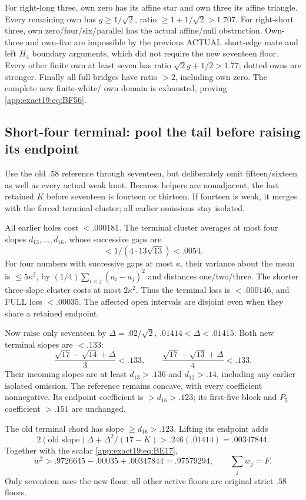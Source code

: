 For right-long three, own zero
has its affine star and own three
its affine triangle.
Every remaining own has
\(g\ge1/\sqrt2\), ratio
\(\ge1+1/\sqrt2>1.707\).
For right-short three, own
zero/four/six/parallel has the
actual affine/null obstruction.
Own-three and own-five are
impossible by the previous
ACTUAL short-edge mate and left
\(H_4\) boundary arguments, which
did not require the new seventeen
floor.
Every other finite own at least
seven has ratio
\(\sqrt2g+1/2>1.77\); dotted
owns are stronger.
Finally all full bridges have
ratio \(>2\), including own zero.
The complete new finite-white/
own domain is exhausted, proving
\eqref{app:exact19:eq:BF56}.

\subsection{Short-four terminal: pool the tail before raising its endpoint}
\label{app:exact19:Bshortfourfinish}

Use the old \(.58\) reference
through seventeen, but deliberately
omit fifteen/sixteen as well as
every actual weak knot.
Because helpers are nonadjacent,
the last retained \(K\) before
seventeen is fourteen or thirteen.
If fourteen is weak, it merges
with the forced terminal cluster;
all earlier omissions stay isolated.

All earlier holes cost \(<.000181\).
The terminal cluster averages
at most four slopes
\(d_{13},\ldots,d_{16}\), whose
successive gaps are
\[
                         <1/(4\cdot13\sqrt{13})<.0054 .
\]
For four numbers with successive
gaps at most \(\kappa\), their
variance about the mean is
\(\le5\kappa^2\), by
\((1/4)\sum_{i<j}(a_i-a_j)^2\)
and distances one/two/three.
The shorter three-slope cluster
costs at most \(2\kappa^2\).
Thus the terminal loss is
\(<.000146\), and FULL loss
\(<.00035\).
The affected open intervals
are disjoint even when they
share a retained endpoint.

Now raise only seventeen by
\(\Delta=.02/\sqrt2\),
\(.01414<\Delta<.01415\).
Both new terminal slopes are
\(<.133\):
\[
 \frac{\sqrt{17}-\sqrt{14}+\Delta}{3}<.133,\qquad
 \frac{\sqrt{17}-\sqrt{13}+\Delta}{4}<.133 .
\]
Their incoming slopes are at
least \(d_{13}>.136\) and
\(d_{12}>.14\), including any
earlier isolated omission.
The reference remains concave,
with every coefficient nonnegative.
Its endpoint coefficient is
\(>d_{16}>.123\); its first-five
block and \(P_5\) coefficient
\(>.151\) are unchanged.

The old terminal chord has slope
\(\ge d_{16}>.123\).
Lifting its endpoint adds
\[
                  2(\text{old slope})\Delta+
                         \Delta^2/(17-K)>.246(.01414)=.00347844 .
\]
Together with the scalar
\eqref{app:exact19:eq:BE17},
\[
             w^2>.9726645-.00035+.00347844=.97579294,
                       \qquad\sum_jw_j=F .
\]
Only seventeen uses the new floor;
all other active floors are
original strict \(.58\) floors.

